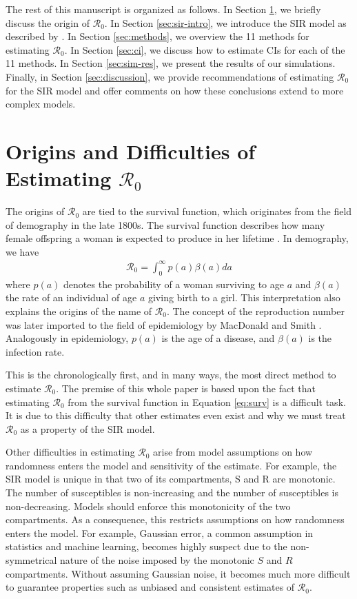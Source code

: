 \message{ !name(draft_v13.tex)}\documentclass[12pt]{article}
\newcommand{\wxxsir}{11 }
\newcommand{\rr}{\ensuremath{\mathcal{R}_0}}
\begin{document}
The rest of this manuscript is organized as follows.  In Section \ref{sec:r0}, we briefly discuss the origin of $\rr$.  In Section \ref{sec:sir-intro}, we introduce the SIR model as described by \cite{Kermack700}.  In Section \ref{sec:methods}, we overview the \wxxsir methods for estimating $\rr$. In Section \ref{sec:ci}, we discuss how to estimate CIs for each of the \wxxsir methods.  In Section \ref{sec:sim-res}, we present the results of our simulations.  Finally, in Section \ref{sec:discussion}, we provide recommendations of estimating $\rr$ for the SIR model and offer comments on how these conclusions extend to more complex models.


\section{Origins and Difficulties of Estimating $\rr$}
\label{sec:r0}

The origins of $\rr$ are tied to the survival function, which originates from the field of demography in the late 1800s.  The survival function describes how many female offspring a woman is expected to produce in her lifetime \citep{dietz1993estimation}.  In demography, we have
\begin{align}\label{eq:surv}
\rr = \int_0^\infty p(a) \beta(a) da
\end{align}
where $p(a)$ denotes the probability of a woman surviving to age $a$ and $\beta(a)$ the rate of an individual of age $a$ giving birth to a  girl.   This interpretation also explains the origins of the name of $\rr$.  The concept of the reproduction number was later imported to the field of epidemiology by MacDonald and Smith \citep{dietz1993estimation}.  Analogously in epidemiology, $p(a)$ is the age of a disease, and $\beta(a)$ is the infection rate.

This is the chronologically first, and in many ways, the most direct method to estimate $\rr$.  The premise of this whole paper is based upon the fact that estimating $\rr$ from the survival function in Equation \eqref{eq:surv} is a difficult task.  It is due to this difficulty that other estimates even exist and why we must treat $\rr$ as a property of the SIR model.

Other difficulties in estimating $\rr$ arise from model assumptions on how randomness enters the model and sensitivity of the estimate.  For example, the SIR model is unique in that two of its compartments, S and R are monotonic.  The number of susceptibles is non-increasing and the number of susceptibles is non-decreasing.  Models should enforce this monotonicity of the two compartments.  As a consequence, this restricts assumptions on how randomness enters the model.  For example, Gaussian error, a common assumption in statistics and machine learning, becomes highly suspect due to the non-symmetrical nature of the noise imposed by the monotonic $S$ and $R$ compartments.  Without assuming Gaussian noise, it becomes much more difficult to guarantee properties such as unbiased and consistent estimates of $\rr$.
\end{document}
